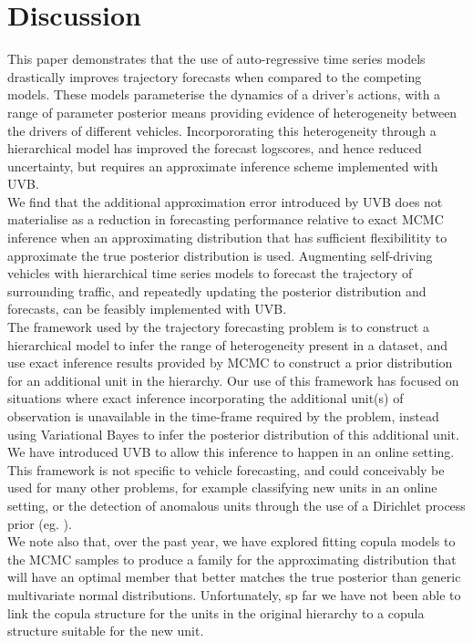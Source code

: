 \documentclass[12pt,a4paper]{article}\usepackage[]{graphicx}\usepackage[]{color}
\begin{document}
\newpage


\section{Discussion}
\label{sec:disc}
This paper demonstrates that the use of auto-regressive time series models drastically improves trajectory forecasts when compared to the competing models.  These models parameterise the dynamics of a driver's actions, with a range of parameter posterior means providing evidence of heterogeneity between the drivers of different vehicles. Incorpororating this heterogeneity through a hierarchical model has improved the forecast logscores, and hence reduced uncertainty, but requires an approximate inference scheme implemented with UVB. 
\\

We find that the additional approximation error introduced by UVB does not materialise as a reduction in forecasting performance relative to exact MCMC inference when an approximating distribution that has sufficient flexibilitity to approximate the true posterior distribution is used. Augmenting self-driving vehicles with hierarchical time series models to forecast the trajectory of surrounding traffic, and repeatedly updating the posterior distribution and forecasts, can be feasibly implemented with UVB.
\\

The framework used by the trajectory forecasting problem is to construct a hierarchical model to infer the range of heterogeneity present in a dataset, and use exact inference results provided by MCMC to construct a prior distribution for an additional unit in the hierarchy. Our use of this framework has focused on situations where exact inference incorporating the additional unit(s) of observation is unavailable in the time-frame required by the problem, instead using Variational Bayes to infer the posterior distribution of this additional unit. We have introduced UVB to allow this inference to happen in an online setting.
\\

This framework is not specific to vehicle forecasting, and could conceivably be used for many other problems, for example classifying new units in an online setting, or the detection of anomalous units through the use of a Dirichlet process prior (eg. \cite{Heard2016, Varadarajan2017}).
\\

We note also that, over the past year, we have explored fitting copula models to the MCMC samples to produce a family for the approximating distribution that will have an optimal member that better matches the true posterior than generic multivariate normal distributions. Unfortunately, sp far we have not been able to link the copula structure for the units in the original hierarchy to a copula structure suitable for the new unit.
\\
\end{document}
